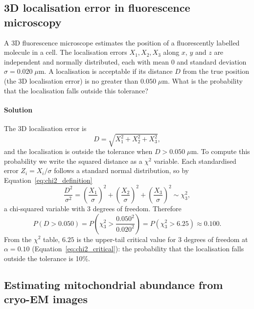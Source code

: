 \subsection{3D localisation error in fluorescence microscopy}
\label{ex:localisation_3d}

A 3D fluorescence microscope estimates the position of a fluorescently labelled molecule in a cell. The localisation errors $X_1, X_2, X_3$ along $x$, $y$ and $z$ are independent and normally distributed, each with mean 0 and standard deviation $\sigma = 0.020\;\mu\text{m}$. A localisation is acceptable if its distance $D$ from the true position (the 3D localisation error) is no greater than $0.050\;\mu\text{m}$. What is the probability that the localisation falls outside this tolerance?

\paragraph{Solution} The 3D localisation error is
\begin{equation*}
D = \sqrt{X_1^2 + X_2^2 + X_3^2},
\end{equation*}
and the localisation is outside the tolerance when $D > 0.050\;\mu\text{m}$. To compute this probability we write the squared distance as a $\chi^2$ variable. Each standardised error $Z_i = X_i/\sigma$ follows a standard normal distribution, so by Equation~\eqref{eq:chi2_definition}
\begin{equation*}
\frac{D^2}{\sigma^2} = \left(\frac{X_1}{\sigma}\right)^2 + \left(\frac{X_2}{\sigma}\right)^2 + \left(\frac{X_3}{\sigma}\right)^2 \sim \chi_3^2,
\end{equation*}
a chi-squared variable with 3 degrees of freedom. Therefore
\begin{equation*}
P(D > 0.050) = P\left(\chi_3^2 > \frac{0.050^2}{0.020^2}\right) = P(\chi_3^2 > 6.25) \approx 0.100.
\end{equation*}
From the $\chi^2$ table, $6.25$ is the upper-tail critical value for 3 degrees of freedom at $\alpha = 0.10$ (Equation~\eqref{eq:chi2_critical}): the probability that the localisation falls outside the tolerance is 10\%.

\subsection{Estimating mitochondrial abundance from cryo-EM images}
\label{ex:mitochondria}

